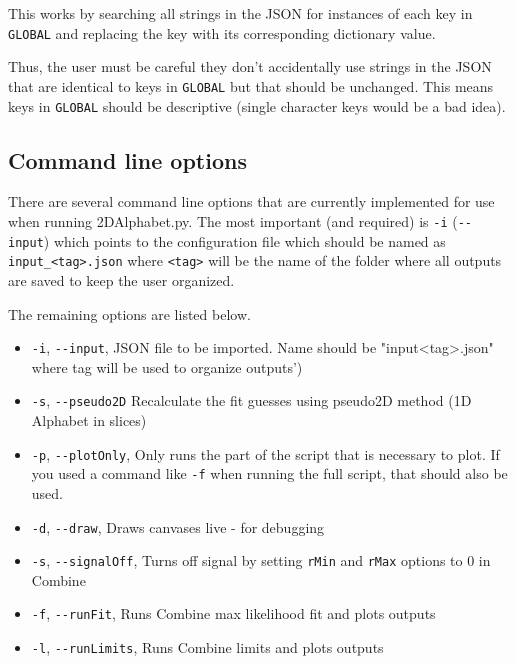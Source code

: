 \documentclass[letter]{article}
\begin{document}
        	This works by searching all strings in the JSON for instances of each key in \verb"GLOBAL" and replacing the key with its corresponding dictionary value.

        	Thus, the user must be careful they don't accidentally use strings in the JSON that are identical to keys in \verb"GLOBAL" but that should be unchanged. This means keys in \verb"GLOBAL" should be descriptive (single character keys would be a bad idea). 


    \subsection{Command line options}
        There are several command line options that are currently implemented for use when running 2DAlphabet.py. The most important (and required) is \verb"-i" (\verb"--input") which points to the configuration file which should be named as \verb"input_<tag>.json" where \verb"<tag>" will be the name of the folder where all outputs are saved to keep the user organized.

        The remaining options are listed below.

        \begin{itemize} 
            \item \verb'-i', \verb'--input', JSON file to be imported. Name should be "input\textunderscore <tag>.json" where tag will be used to organize outputs')
            \item \verb'-s', \verb'--pseudo2D' Recalculate the fit guesses using pseudo2D method (1D Alphabet in slices)
            \item \verb'-p', \verb'--plotOnly', Only runs the part of the script that is necessary to plot. If you used a command like \verb'-f' when running the full script, that should also be used.
            \item \verb'-d', \verb'--draw', Draws canvases live - for debugging
            \item \verb'-s', \verb'--signalOff', Turns off signal by setting \verb'rMin' and \verb'rMax' options to 0 in Combine
            \item \verb'-f', \verb'--runFit', Runs Combine max likelihood fit and plots outputs
            \item \verb'-l', \verb'--runLimits', Runs Combine limits and plots outputs
        \end{itemize}
\end{document}
